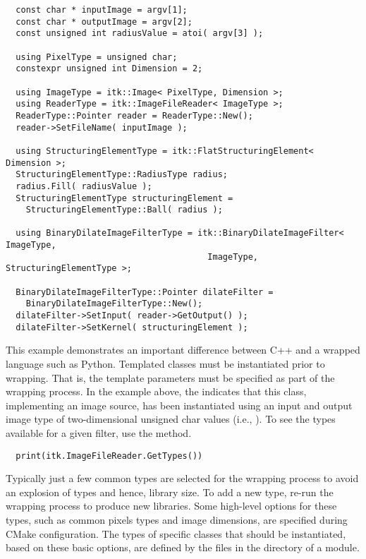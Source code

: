 \small
\begin{verbatim}
  const char * inputImage = argv[1];
  const char * outputImage = argv[2];
  const unsigned int radiusValue = atoi( argv[3] );

  using PixelType = unsigned char;
  constexpr unsigned int Dimension = 2;

  using ImageType = itk::Image< PixelType, Dimension >;
  using ReaderType = itk::ImageFileReader< ImageType >;
  ReaderType::Pointer reader = ReaderType::New();
  reader->SetFileName( inputImage );

  using StructuringElementType = itk::FlatStructuringElement< Dimension >;
  StructuringElementType::RadiusType radius;
  radius.Fill( radiusValue );
  StructuringElementType structuringElement =
    StructuringElementType::Ball( radius );

  using BinaryDilateImageFilterType = itk::BinaryDilateImageFilter< ImageType,
                                        ImageType, StructuringElementType >;

  BinaryDilateImageFilterType::Pointer dilateFilter =
    BinaryDilateImageFilterType::New();
  dilateFilter->SetInput( reader->GetOutput() );
  dilateFilter->SetKernel( structuringElement );
\end{verbatim}
\normalsize

This example demonstrates an important difference between C++ and a wrapped
language such as Python. Templated classes must be instantiated prior to
wrapping. That is, the template parameters must be specified as part of the
wrapping process. In the example above, the
 indicates that this class, implementing
an image source, has been
instantiated using an input and output image type of two-dimensional unsigned
char values (i.e., ). To see the types available for a given filter,
use the  method.

\small
\begin{verbatim}
  print(itk.ImageFileReader.GetTypes())
\end{verbatim}
\normalsize

Typically just a few common types are selected for the wrapping process to
avoid an explosion of types and hence, library size. To add a new type, re-run
the wrapping process to produce new libraries. Some high-level options for
these types, such as common pixels types and image dimensions, are specified
during CMake configuration.  The types of specific classes that should be
instantiated, based on these basic options, are defined by the 
files in the  directory of a module.

